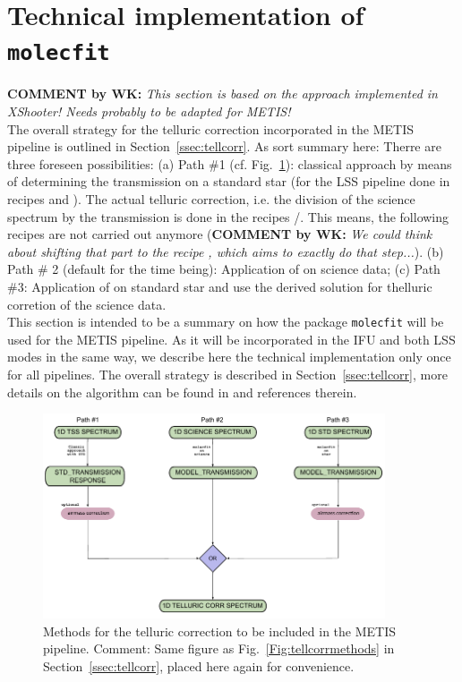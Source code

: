 \section{Technical implementation of \texttt{molecfit}}\label{app:mf}
\textbf{COMMENT by WK:} \textit{This section is based on the approach implemented in XShooter! Needs probably to be adapted for METIS!}\\[0.5cm]

The overall strategy for the telluric correction incorporated in the METIS pipeline is outlined in Section~\ref{ssec:tellcorr}. As sort summary here: Therre are three foreseen possibilities: (a) Path \#1 (cf. Fig.~\ref{Fig:tellcorrmethods2}): classical approach by means of determining the transmission on a standard star (for the LSS pipeline done in recipes  and ). The actual telluric correction, i.e. the division of the science spectrum by the transmission is done in the recipes /. This means, the following recipes are not carried out anymore (\textbf{COMMENT by WK:} \textit{We could think about shifting that part to the recipe , which aims to exactly do that step...}). (b) Path \# 2 (default for the time being): Application of \mf on science data; (c) Path \#3: Application of \mf on standard star and use the derived solution for thelluric corretion of the science data.\\
This section is intended to be a summary on how the package \texttt{molecfit} will be used for the \ac{METIS} pipeline. As it will be incorporated in the \ac{IFU} and both \ac{LSS} modes in the same way, we describe here the technical implementation only once for all pipelines. The overall strategy is described in Section~\ref{ssec:tellcorr}, more details on the \mf algorithm can be found in \cite{molecfit} and references therein.
\begin{figure}[ht]
  \centering
  \includegraphics[width=0.9\textwidth]{figures/tell_corr_methods.pdf}
    \caption[Methods for the telluric correction to be included in the METIS pipeline]{%
        Methods for the telluric correction to be included in the \ac{METIS} pipeline. Comment: Same figure as Fig.~\ref{Fig:tellcorrmethods} in Section~\ref{ssec:tellcorr}, placed here again for convenience. }
  \label{Fig:tellcorrmethods2}
\end{figure}

